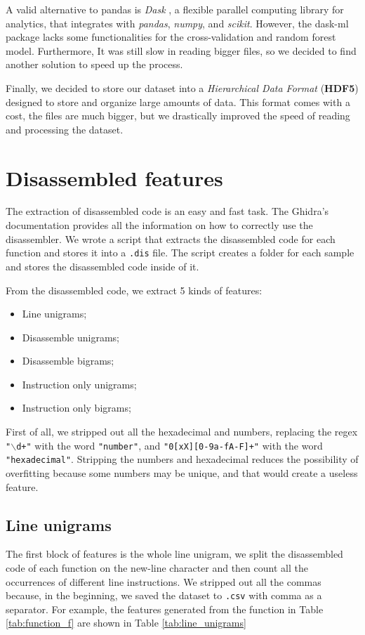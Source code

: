 A valid alternative to pandas is \textit{Dask} \cite{dask}, a flexible parallel computing library for analytics, that integrates with \textit{pandas},  \textit{numpy}, and \textit{scikit}. However, the dask-ml package lacks some functionalities for the cross-validation and random forest model. Furthermore, It was still slow in reading bigger files, so we decided to find another solution to speed up the process.

Finally, we decided to store our dataset into a \textit{Hierarchical Data Format} (\textbf{HDF5}) \cite{hdf} designed to store and organize large amounts of data. This format comes with a cost, the files are much bigger, but we drastically improved the speed of reading and processing the dataset.


\section{Disassembled features}

The extraction of disassembled code is an easy and fast task. The Ghidra's documentation provides all the information on how to correctly use the disassembler. We wrote a script that extracts the disassembled code for each function and stores it into a \texttt{.dis} file. The script creates a folder for each sample and stores the disassembled code inside of it.

From the disassembled code, we extract 5 kinds of features:
\begin{itemize}
	\item{Line unigrams;}
	\item{Disassemble unigrams;}
	\item{Disassemble bigrams;}
	\item{Instruction only unigrams;}
	\item{Instruction only bigrams;}
\end{itemize}

First of all, we stripped out all the hexadecimal and numbers, replacing the regex \texttt{"$\backslash$d+"} with the word \texttt{"number"}, and \texttt{"0[xX][0-9a-fA-F]+"} with the word \texttt{"hexadecimal"}. Stripping the numbers and hexadecimal reduces the possibility of overfitting because some numbers may be unique, and that would create a useless feature.


\subsection{Line unigrams}
The first block of features is the whole line unigram, we split the disassembled code of each function on the new-line character and then count all the occurrences of different line instructions. We stripped out all the commas because, in the beginning, we saved the dataset to \texttt{.csv} with comma as a separator. For example, the features generated from the function in Table \ref{tab:function_f} are shown in Table \ref{tab:line_unigrams}

